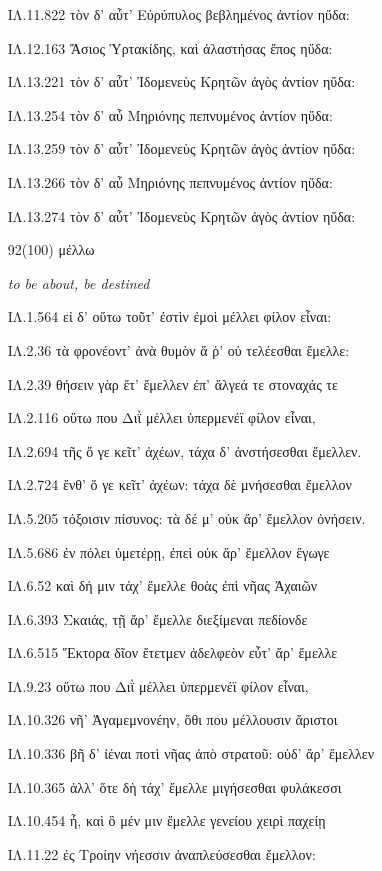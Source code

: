 \begin{enumerate}
{ΙΛ.11.822 τὸν δ' αὖτ' Εὐρύπυλος βεβλημένος ἀντίον ηὔδα:

ΙΛ.12.163 Ἄσιος Ὑρτακίδης, καὶ ἀλαστήσας ἔπος ηὔδα:

ΙΛ.13.221 τὸν δ' αὖτ' Ἰδομενεὺς Κρητῶν ἀγὸς ἀντίον ηὔδα:

ΙΛ.13.254 τὸν δ' αὖ Μηριόνης πεπνυμένος ἀντίον ηὔδα:

ΙΛ.13.259 τὸν δ' αὖτ' Ἰδομενεὺς Κρητῶν ἀγὸς ἀντίον ηὔδα:

ΙΛ.13.266 τὸν δ' αὖ Μηριόνης πεπνυμένος ἀντίον ηὔδα:

ΙΛ.13.274 τὸν δ' αὖτ' Ἰδομενεὺς Κρητῶν ἀγὸς ἀντίον ηὔδα:

}

\clearpage
\item[\large 92(100)]{\large \g μέλλω}

\hspace{0.2cm} \textit{ to be about, be destined }

{\g
ΙΛ.1.564 εἰ δ' οὕτω τοῦτ' ἐστὶν ἐμοὶ μέλλει φίλον εἶναι: 

ΙΛ.2.36 τὰ φρονέοντ' ἀνὰ θυμὸν ἅ ῥ' οὐ τελέεσθαι ἔμελλε: 

ΙΛ.2.39 θήσειν γὰρ ἔτ' ἔμελλεν ἐπ' ἄλγεά τε στοναχάς τε 

ΙΛ.2.116 οὕτω που Διῒ μέλλει ὑπερμενέϊ φίλον εἶναι, 

ΙΛ.2.694 τῆς ὅ γε κεῖτ' ἀχέων, τάχα δ' ἀνστήσεσθαι ἔμελλεν. 

ΙΛ.2.724 ἔνθ' ὅ γε κεῖτ' ἀχέων: τάχα δὲ μνήσεσθαι ἔμελλον 

ΙΛ.5.205 τόξοισιν πίσυνος: τὰ δέ μ' οὐκ ἄρ' ἔμελλον ὀνήσειν. 

ΙΛ.5.686 ἐν πόλει ὑμετέρῃ, ἐπεὶ οὐκ ἄρ' ἔμελλον ἔγωγε 

ΙΛ.6.52 καὶ δή μιν τάχ' ἔμελλε θοὰς ἐπὶ νῆας Ἀχαιῶν 

ΙΛ.6.393 Σκαιάς, τῇ ἄρ' ἔμελλε διεξίμεναι πεδίονδε 

ΙΛ.6.515 Ἕκτορα δῖον ἔτετμεν ἀδελφεὸν εὖτ' ἄρ' ἔμελλε 

ΙΛ.9.23 οὕτω που Διῒ μέλλει ὑπερμενέϊ φίλον εἶναι, 

ΙΛ.10.326 νῆ' Ἀγαμεμνονέην, ὅθι που μέλλουσιν ἄριστοι 

ΙΛ.10.336 βῆ δ' ἰέναι ποτὶ νῆας ἀπὸ στρατοῦ: οὐδ' ἄρ' ἔμελλεν 

ΙΛ.10.365 ἀλλ' ὅτε δὴ τάχ' ἔμελλε μιγήσεσθαι φυλάκεσσι 

ΙΛ.10.454 ἦ, καὶ ὃ μέν μιν ἔμελλε γενείου χειρὶ παχείῃ 

ΙΛ.11.22 ἐς Τροίην νήεσσιν ἀναπλεύσεσθαι ἔμελλον: 

}
\end{enumerate}
